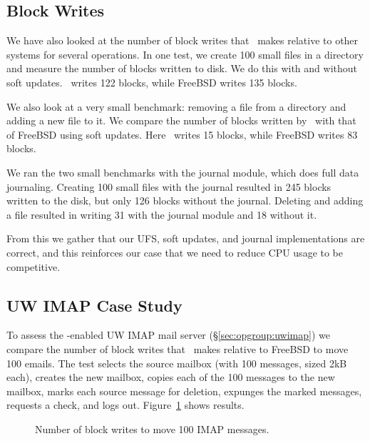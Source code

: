 \subsection {Block Writes}
We have also looked at the number of block writes that \Kudos\ makes
relative to other systems for several operations. In one test, we
create 100 small files in a directory and measure the number of blocks
written to disk. We do this with and without soft updates. \Kudos\
writes 122 blocks, while FreeBSD writes 135 blocks.

We also look at a very small benchmark: removing a file from a
directory and adding a new file to it. We compare the number of blocks
written by \Kudos\ with that of FreeBSD using soft updates. Here
\Kudos\ writes 15 blocks, while FreeBSD writes 83 blocks.

We ran the two small benchmarks with the journal module, which does
full data journaling. Creating 100 small files with the journal
resulted in 245 blocks written to the disk, but only 126 blocks
without the journal. Deleting and adding a file resulted in writing
31 with the journal module and 18 without it.

From this we gather that our UFS, soft updates, and journal
implementations are correct, and this reinforces our case that we need
to reduce CPU usage to be competitive.

\subsection {UW IMAP Case Study}
\label{sec:evaluation:uwimap}
To assess the \opgroup-enabled UW IMAP mail server
(\S\ref{sec:opgroup:uwimap}) we compare the number of block writes
that \Kudos\ makes relative to FreeBSD to move 100 emails. The test
selects the source mailbox (with 100 messages, sized 2kB each),
creates the new mailbox, copies each of the 100 messages to the new
mailbox, marks each source message for deletion, expunges the marked
messages, requests a check, and logs out.
Figure~\ref{fig:imap-compare} shows results.

\begin{figure}[htb]
\caption{\label{fig:imap-compare} Number of block writes to move 100
  IMAP messages.}
\end{figure}
